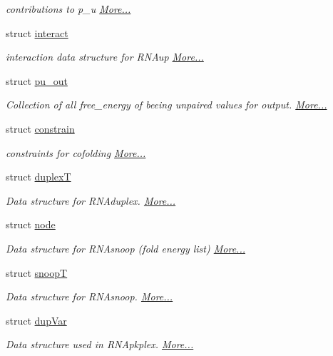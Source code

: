 \begin{DoxyCompactItemize}
\begin{DoxyCompactList}\small\item\em contributions to p\+\_\+u  \hyperlink{group__data__structures_structpu__contrib}{More...}\end{DoxyCompactList}\item 
struct \hyperlink{group__data__structures_structinteract}{interact}
\begin{DoxyCompactList}\small\item\em interaction data structure for R\+N\+Aup  \hyperlink{group__data__structures_structinteract}{More...}\end{DoxyCompactList}\item 
struct \hyperlink{group__data__structures_structpu__out}{pu\+\_\+out}
\begin{DoxyCompactList}\small\item\em Collection of all free\+\_\+energy of beeing unpaired values for output.  \hyperlink{group__data__structures_structpu__out}{More...}\end{DoxyCompactList}\item 
struct \hyperlink{group__data__structures_structconstrain}{constrain}
\begin{DoxyCompactList}\small\item\em constraints for cofolding  \hyperlink{group__data__structures_structconstrain}{More...}\end{DoxyCompactList}\item 
struct \hyperlink{group__data__structures_structduplexT}{duplexT}
\begin{DoxyCompactList}\small\item\em Data structure for R\+N\+Aduplex.  \hyperlink{group__data__structures_structduplexT}{More...}\end{DoxyCompactList}\item 
struct \hyperlink{group__data__structures_structnode}{node}
\begin{DoxyCompactList}\small\item\em Data structure for R\+N\+Asnoop (fold energy list)  \hyperlink{group__data__structures_structnode}{More...}\end{DoxyCompactList}\item 
struct \hyperlink{group__data__structures_structsnoopT}{snoopT}
\begin{DoxyCompactList}\small\item\em Data structure for R\+N\+Asnoop.  \hyperlink{group__data__structures_structsnoopT}{More...}\end{DoxyCompactList}\item 
struct \hyperlink{group__data__structures_structdupVar}{dup\+Var}
\begin{DoxyCompactList}\small\item\em Data structure used in R\+N\+Apkplex.  \hyperlink{group__data__structures_structdupVar}{More...}\end{DoxyCompactList}\end{DoxyCompactItemize}
